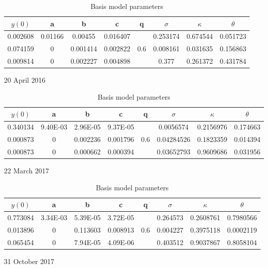 \documentclass[12pt,a4paper]{article}
\theoremstyle{plain}
\numberwithin{equation}{section}
\begin{document}
\begin{table}[t]
\begin{subtable}{1.0\textwidth}

\begin{tabular}{|cccccccc|}
    \hline
    \multicolumn{1}{|c|}{$y(0)$} & \multicolumn{1}{c|}{a} & \multicolumn{1}{c|}{b} & \multicolumn{1}{c|}{c} & \multicolumn{1}{c|}{q} & \multicolumn{1}{c|}{$\sigma$} & \multicolumn{1}{c|}{$\kappa$} & $\theta$ \\
    \hline
    0.002608 & 0.01166 & 0.00455 & 0.016407 &       & 0.253174 & 0.674544 & 0.051723 \\
    0.074159 & 0     & 0.001414 & 0.002822 & 0.6   & 0.008161 & 0.031635 & 0.156863 \\
    0.009814 & 0     & 0.002227 & 0.004898 &       & 0.377 & 0.261372 & 0.431784 \\
    \hline
    \end{tabular}%
\caption{20 April 2016}
\end{subtable}

\begin{subtable}{1.0\textwidth}

\begin{tabular}{|cccccccc|}
    \hline
    \multicolumn{1}{|c|}{$y(0)$} & \multicolumn{1}{c|}{a} & \multicolumn{1}{c|}{b} & \multicolumn{1}{c|}{c} & \multicolumn{1}{c|}{q} & \multicolumn{1}{c|}{$\sigma$} & \multicolumn{1}{c|}{$\kappa$} & $\theta$ \\
    \hline
   0.340134 & 9.40E-03 & 2.96E-05 & 9.37E-05 &       & 0.0056574 & 0.2156976 & 0.174663 \\
    0.000873 & 0     & 0.002236 & 0.001796 & 0.6   & 0.04284526 & 0.1823359 & 0.014394 \\
    0.000873 & 0     & 0.000662 & 0.000394 &       & 0.03652793 & 0.9609686 & 0.031956 \\

    \hline
    \end{tabular}%
\caption{22 March 2017}
\end{subtable}

\begin{subtable}{1.0\textwidth}

\begin{tabular}{|cccccccc|}
    \hline
    \multicolumn{1}{|c|}{$y(0)$} & \multicolumn{1}{c|}{a} & \multicolumn{1}{c|}{b} & \multicolumn{1}{c|}{c} & \multicolumn{1}{c|}{q} & \multicolumn{1}{c|}{$\sigma$} & \multicolumn{1}{c|}{$\kappa$} & $\theta$ \\
    \hline
   0.773084 & 3.34E-03 & 5.39E-05 & 3.72E-05 &       & 0.264573 & 0.2608761 & 0.7980566 \\
    0.013896 & 0     & 0.113603 & 0.008913 & 0.6   & 0.004227 & 0.3975118 & 0.0002119 \\
    0.065454 & 0     & 7.94E-05 & 4.09E-06 &       & 0.403512 & 0.9037867 & 0.8058104 \\
    \hline
    \end{tabular}%
\caption{31 October 2017}
\end{subtable}
\caption{Basis model parameters}\label{basispartbla}
\end{table}
\end{document}
